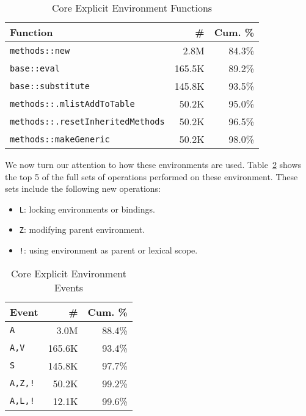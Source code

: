 \documentclass[10pt,sigplan,authorversion=true]{acmart}
\renewcommand{\c}[1]{\lstinline |#1|\xspace}
\begin{document}
\begin{table}[!h]
  \small
  \caption{Core Explicit Environment Functions} \label{table:core_explicit_fun}
  \centering
  \begin{tabular}{lrr}
    \toprule
    \textbf{Function}&\textbf{\#}&\textbf{Cum. \%}\\
    \midrule
    \c{methods::new}&2.8M&84.3\%\\
    \c{base::eval}&165.5K&89.2\%\\
    \c{base::substitute}&145.8K&93.5\%\\
    \c{methods::.mlistAddToTable}&50.2K&95.0\%\\
    \c{methods::.resetInheritedMethods}&50.2K&96.5\%\\
    \c{methods::makeGeneric}&50.2K&98.0\%\\
    \bottomrule
  \end{tabular}
\end{table}

\noindent
We now turn our attention to how these environments are used.
Table~\ref{table:core_explicit_env_seq} shows the top 5 of the full sets of
operations performed on these environment. These sets include the following new
operations:

\begin{itemize}
\item \texttt{L}: locking environments or bindings.
\item \texttt{Z}: modifying parent environment.
\item \texttt{!}: using environment as parent or lexical scope.
\end{itemize}

\begin{table}[!h]
  \small
  \caption{Core Explicit Environment Events} \label{table:core_explicit_env_seq}
  \centering
  \begin{tabular}{lrr}
    \toprule
    \textbf{Event}&\textbf{\#}&\textbf{Cum. \%}\\
    \midrule
    \texttt{A}&3.0M&88.4\%\\
    \texttt{A,V}&165.6K&93.4\%\\
    \texttt{S}&145.8K&97.7\%\\
    \texttt{A,Z,!}&50.2K&99.2\%\\
    \texttt{A,L,!}&12.1K&99.6\%\\
    \bottomrule
  \end{tabular}
\end{table}
\end{document}
